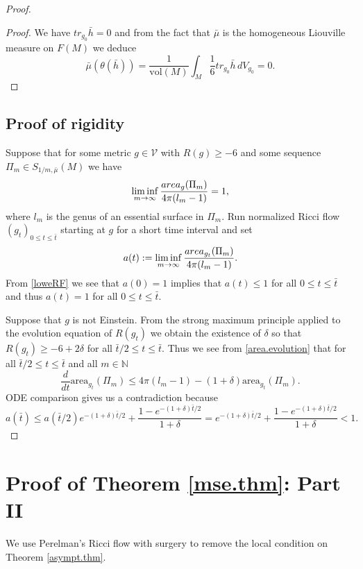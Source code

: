 \documentclass[11pt]{amsart}
\def\N{\mathbb N}
\theoremstyle{remark}
\theoremstyle{definition}
\begin{document}
{{\begin{proof}
\begin{proof}
			
			{We have $tr_{g_0}\bar h=0$  and  from the fact that $\bar\mu$ is the homogeneous Liouville measure on $F(M)$ we deduce
			$$\bar\mu(\theta(\bar h))=\frac{1}{\text{vol}(M)}\int_M \frac{1}{6}tr_{g_0}\bar h\,dV_{g_0}=0.$$ }
		\end{proof}	
				
		
		
		\subsection{Proof of rigidity} Suppose that for some metric $g\in \mathcal V$ with $R(g)\geq -6$  and some  sequence  $\Pi_m\in {S_{1/m,\bar\mu}(M)}$ we have
		$$\liminf_{m\to\infty}\frac{{\rm area}_g(\Pi_m)}{4\pi(l_m-1)}= 1,$$
		where $l_m$ is the genus of an essential surface in $\Pi_m$. 
		Run normalized Ricci flow $(g_t)_{0\leq t\leq \bar t}$ starting at $g$ for a short time interval and set
		$$a(t):=\liminf_{m\to\infty}\frac{{\rm area}_{g_t}(\Pi_m)}{4\pi(l_m-1)}.$$
		From \eqref{loweRF} we see that  $a(0)=1$ implies that $a(t)\leq 1$ for all  $0\leq t\leq \bar t$ and thus $a(t)=1$ for all  $0\leq t\leq \bar t$.
		
		
		Suppose that $g$ is not Einstein. From the strong maximum principle applied to the evolution equation of $R(g_t)$ we obtain the existence of $\delta$ so that $R(g_t)\geq -6+2\delta$ for all $\bar t/2\leq t\leq\bar t$. Thus we see from \eqref{area.evolution} that  for all $\bar t/2\leq t\leq\bar t$ and all $m\in\N$ 
		$$
		\frac{d}{dt}\text{area}_{g_t}(\Pi_m)  \leq 4\pi(l_m-1)-(1+\delta)\text{area}_{g_t}(\Pi_m).
		$$
		ODE comparison gives us a contradiction because
		$$a(\bar t)\leq a(\bar t/2)e^{-(1+\delta)\bar t/2}+\frac{1-e^{-(1+\delta)\bar t/2}}{1+\delta}= e^{-(1+\delta)\bar t/2}+\frac{1-e^{-(1+\delta)\bar t/2}}{1+\delta}<1.$$
	\end{proof}
	
	\section{Proof of Theorem \ref{mse.thm}: Part II}
	We use Perelman's Ricci flow with surgery \cite{perelman} to remove the local condition on Theorem \ref{asympt.thm}.
	
}}
\end{document}
